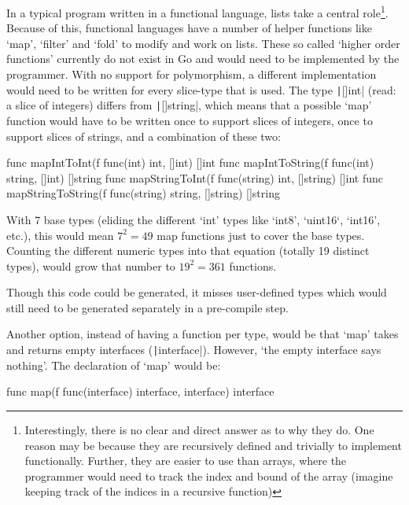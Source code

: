 In a typical program written in a functional language, lists take a central role\footnote{Interestingly,
	there is no clear and direct answer as to why they do. One reason may be because they are recursively
	defined and trivially to implement functionally. Further, they are easier to use than arrays, where
	the programmer would need to track the index and bound of the array (imagine keeping track of the
indices in a recursive function)\autocite{why-lists}}. Because of this, functional languages have
a number of helper functions like `map', `filter' and `fold'\autocite{haskell-list-funcs} to modify and
work on lists. These so called `higher order functions' currently do
not exist in Go and would need to be implemented by the programmer. With no support for polymorphism, a
different implementation would need to be written for every slice-type that is used. The type \texttt|[]int|
(read: a slice of integers) differs from \texttt|[]string|, which means that a possible
`map' function would have to be written once to support slices of integers, once to support slices
of strings, and a combination of these two:

\begin{gocode}
func mapIntToInt(f func(int) int, []int) []int
func mapIntToString(f func(int) string, []int) []string
func mapStringToInt(f func(string) int, []string) []int
func mapStringToString(f func(string) string, []string) []string
\end{gocode}

With 7 base types (eliding the different `int' types like `int8', `uint16`, `int16', etc.), this would
mean $7^{2} = 49$ map functions just to cover the base types. Counting the different numeric
types into that equation (totally 19 distinct types\autocite{go-basetypes}), would grow that number to $19^{2} = 361$ functions.

Though this code could be generated, it misses user-defined types which would still
need to be generated separately in a pre-compile step.

Another option, instead of having a function per type, would be that `map' takes and returns empty interfaces
(\texttt|interface{}|). However, `the empty interface says
nothing'\autocite{empty-interface}. The declaration of `map' would be:
\begin{gocode}
	func map(f func(interface{}) interface{}, interface{}) interface{}
\end{gocode}

